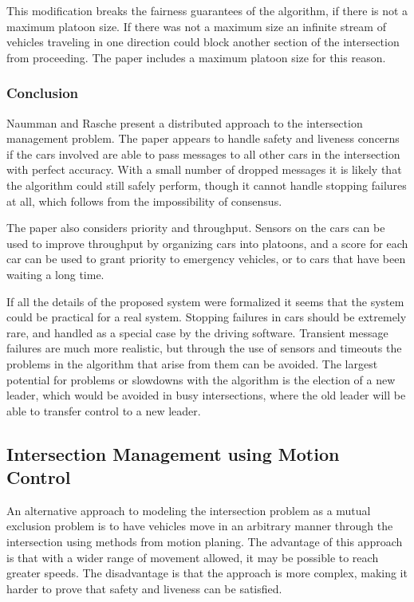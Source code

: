 \documentclass[12pt]{article}
\begin{document}
This modification breaks the fairness guarantees of the algorithm, if there is not a maximum platoon size. If there was not a maximum size an infinite stream of vehicles traveling in one direction could block another section of the intersection from proceeding. The paper includes a maximum platoon size for this reason.\par
\subsubsection{Conclusion}
Naumman and Rasche present a distributed approach to the intersection management problem. The paper appears to handle safety and liveness concerns if the cars involved are able to pass messages to all other cars in the intersection with perfect accuracy. With a small number of dropped messages it is likely that the algorithm could still safely perform, though it cannot handle stopping failures at all, which follows from the impossibility of consensus. \par
The paper also considers priority and throughput. Sensors on the cars can be used to improve throughput by organizing cars into platoons, and a score for each car can be used to grant priority to emergency vehicles, or to cars that have been waiting a long time.\par
If all the details of the proposed system were formalized it seems that the system could be practical for a real system. Stopping failures in cars should be extremely rare, and handled as a special case by the driving software. Transient message failures are much more realistic, but through the use of sensors and timeouts the problems in the algorithm that arise from them can be avoided. The largest potential for problems or slowdowns with the algorithm is the election of a new leader, which would be avoided in busy intersections, where the old leader will be able to transfer control to a new leader. \par

\subsection{Intersection Management using Motion Control}
\label{sec:DNF}
An alternative approach to modeling the intersection problem as a mutual exclusion problem is to have vehicles move in an arbitrary manner through the intersection using methods from motion planing. The advantage of this approach is that with a wider range of movement allowed, it may be possible to reach greater speeds. The disadvantage is that the approach is more complex, making it harder to prove that safety and liveness can be satisfied.\par
\end{document}
